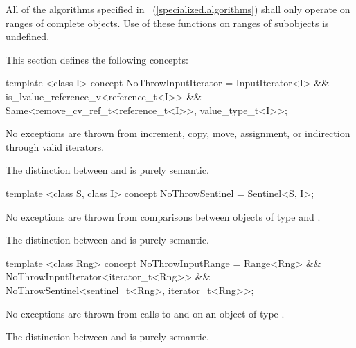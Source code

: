 {\color{addclr}
\setcounter{Paras}{0}
\pnum
All of the algorithms specified in ~(\ref{specialized.algorithms}) shall only operate on ranges of
complete objects. Use of these functions on ranges of subobjects is undefined.


\pnum This section defines the following concepts:

\begin{itemdecl}
template <class I>
concept NoThrowInputIterator =
  InputIterator<I> &&
  is_lvalue_reference_v<reference_t<I>> &&
  Same<remove_cv_ref_t<reference_t<I>>, value_type_t<I>>;
\end{itemdecl}

\begin{itemdescr}
\pnum No exceptions are thrown from increment, copy, move, assignment, or indirection through valid
iterators.

\pnum
\enternote The distinction between  and
 is purely semantic.\exitnote
\end{itemdescr}

\begin{itemdecl}
template <class S, class I>
concept NoThrowSentinel =
  Sentinel<S, I>;
\end{itemdecl}

\begin{itemdescr}
\pnum No exceptions are thrown from comparisons between objects of type  and .

\pnum
\enternote The distinction between  and
 is purely semantic.\exitnote
\end{itemdescr}

\begin{itemdecl}
template <class Rng>
concept NoThrowInputRange =
  Range<Rng> &&
  NoThrowInputIterator<iterator_t<Rng>> &&
  NoThrowSentinel<sentinel_t<Rng>, iterator_t<Rng>>;
\end{itemdecl}

\begin{itemdescr}
\pnum No exceptions are thrown from calls to  and  on an object of type
.

\pnum
\enternote The distinction between  and
 is purely semantic.\exitnote
\end{itemdescr}

}
